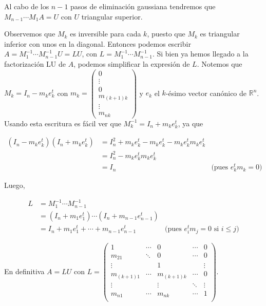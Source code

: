 Al cabo de los $n - 1$ pasos de eliminación gaussiana tendremos que $M_{n - 1} \cdots M_1 A = U$ con $U$ triangular superior. 

Observemos que $M_k$ es inversible para cada $k$, puesto que $M_k$ es triangular inferior con unos en la diagonal. Entonces podemos escribir $A = M_1^{-1}\cdots M_{n - 1}^{-1} U = LU$, con $L = M_1^{-1}\cdots M_{n - 1}^{-1}$. Si bien ya hemos llegado a la factorización LU de $A$, podemos simplificar la expresión de $L$. Notemos que $M_k = I_n - m_k e_k^t$ con $m_k = \begin{pmatrix}0\\ \vdots \\ 0 \\ m_{(k+1)k} \\ \vdots \\ m_{nk}\end{pmatrix}$ y $e_k$ el $k$-ésimo vector canónico de $\mathbb{R}^n$. Usando esta escritura es fácil ver que $M_k^{-1} = I_n + m_k e_k^t$, ya que

\begin{align*}
(I_n - m_k e_k^t)(I_n + m_k e_k^t) & = I_n^2 + m_k e_k^t - m_k e_k^t - m_k e_k^t m_k e_k^t &\\
& = I_n^2 - m_k e_k^t m_k e_k^t &\\
& = I_n & \text{(pues } e_k^t m_k = 0\text{)}
\end{align*}

Luego,

\begin{align*}
L & = M_1^{-1} \cdots M_{n - 1}^{-1} &\\
	& = (I_n + m_1 e_1^t) \cdots (I_n + m_{n - 1} e_{n - 1}^t) &\\
	& = I_n + m_1 e_1^t + \cdots + m_{n - 1} e_{n - 1}^t & \text{(pues } e_i^t m_j = 0 \text{ si } i \leq j \text{)}
\end{align*}

En definitiva $A = LU$ con $L = \begin{pmatrix} 
1 			& \cdots 	& 0 				& \cdots 	& 0 \\
m_{21} 		& \ddots 	& 0 				& \cdots 	& 0 \\
\vdots 		& 			& 1 				& 			& \vdots\\
m_{(k+1)1}	& \cdots		& m_{(k+1)k} 	& \cdots		& 0\\
\vdots		& 			& \vdots		 	& \ddots		& \vdots\\
m_{n1}		& \cdots		& m_{nk}		& \cdots		& 1\\
\end{pmatrix}$.

